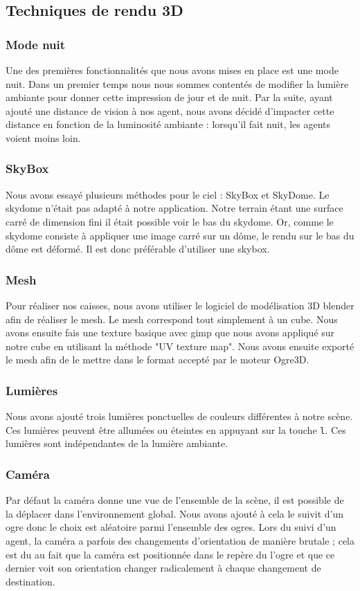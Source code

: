 \subsection{Techniques de rendu 3D}

\subsubsection{Mode nuit}
Une des premières fonctionnalités que nous avons mises en place est une mode
nuit. Dans un premier temps nous nous sommes contentés de modifier la lumière
ambiante pour donner cette impression de jour et de nuit. Par la suite, ayant
ajouté une distance de vision à nos agent, nous avons décidé d'impacter cette
distance en fonction de la luminosité ambiante : lorsqu'il fait nuit, les
agents voient moins loin.

\subsubsection{SkyBox}
Nous avons essayé plusieurs méthodes pour le ciel : SkyBox et SkyDome. Le
skydome n'était pas adapté à notre application. Notre terrain étant une
surface carré de dimension fini il était possible voir le bas du skydome.
Or, comme le skydome consiste à appliquer une image carré sur un dôme, le
rendu sur le bas du dôme est déformé. Il est donc préférable d'utiliser une
skybox.

\subsubsection{Mesh}
Pour réaliser nos caisses, nous avons utiliser le logiciel de modélisation 3D
blender afin de réaliser le mesh. Le mesh correspond tout simplement à un
cube. Nous avons ensuite fais une texture basique avec gimp que nous avons
appliqué sur notre cube en utilisant la méthode "UV texture map".
Nous avons ensuite exporté le mesh afin de le mettre dans le format
accepté par le moteur Ogre3D.

\subsubsection{Lumières}
Nous avons ajouté trois lumières ponctuelles de couleurs différentes à notre
scène. Ces lumières peuvent être allumées ou éteintes en appuyant sur la
touche \verb!l!. Ces lumières sont indépendantes de la lumière ambiante.

\subsubsection{Caméra}
Par défaut la caméra donne une vue de l'ensemble de la scène, il est possible
de la déplacer dans l'environnement global. Nous avons ajouté à cela le suivit
d'un ogre donc le choix est aléatoire parmi l'ensemble des ogres. Lors du
suivi d'un agent, la caméra a parfois des changements d'orientation de manière
brutale ; cela est du au fait que la caméra est positionnée dans le repère du
l'ogre et que ce dernier voit son orientation changer radicalement à chaque
changement de destination.

